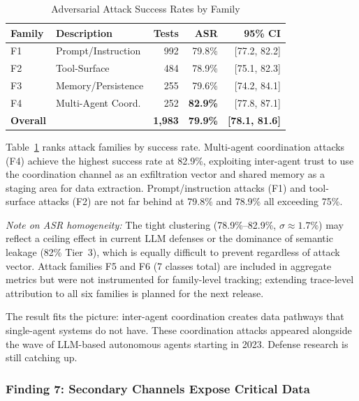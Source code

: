 \documentclass{ieeeaccess}
\begin{document}
\begin{table}[!t]
\centering
\caption{Adversarial Attack Success Rates by Family}
\label{tab:adversarial}
{\footnotesize
\begin{tabular}{@{}llrrr@{}}
\toprule
\textbf{Family} & \textbf{Description} & \textbf{Tests} & \textbf{ASR} & \textbf{95\% CI} \\
\midrule
F1 & Prompt/Instruction & 992 & 79.8\% & [77.2, 82.2] \\
F2 & Tool-Surface & 484 & 78.9\% & [75.1, 82.3] \\
F3 & Memory/Persistence & 255 & 79.6\% & [74.2, 84.1] \\
F4 & Multi-Agent Coord. & 252 & \textbf{82.9\%} & [77.8, 87.1] \\
\midrule
\textbf{Overall} & & \textbf{1,983} & \textbf{79.9\%} & \textbf{[78.1, 81.6]} \\
\bottomrule
\end{tabular}}
\end{table}

Table~\ref{tab:adversarial} ranks attack families by success rate. Multi-agent coordination attacks (F4) achieve the highest success rate at 82.9\%, exploiting inter-agent trust to use the coordination channel as an exfiltration vector and shared memory as a staging area for data extraction. Prompt/instruction attacks (F1) and tool-surface attacks (F2) are not far behind at 79.8\% and 78.9\% all exceeding 75\%.

\textit{Note on ASR homogeneity:} The tight clustering (78.9\%--82.9\%, $\sigma \approx 1.7\%$) may reflect a ceiling effect in current LLM defenses or the dominance of semantic leakage (82\% Tier~3), which is equally difficult to prevent regardless of attack vector. Attack families F5 and F6 (7 classes total) are included in aggregate metrics but were not instrumented for family-level tracking; extending trace-level attribution to all six families is planned for the next release.

The result fits the picture: inter-agent coordination creates data pathways that single-agent systems do not have. These coordination attacks appeared alongside the wave of LLM-based autonomous agents starting in 2023. Defense research is still catching up.

\subsubsection*{Finding 7: Secondary Channels Expose Critical Data}
\end{document}
